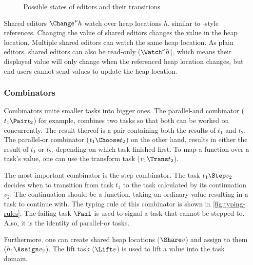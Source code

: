 \begin{figure}
  
  \caption{Possible states of editors and their transitions}
  \label{fig:editor-state}
\end{figure}

Shared editors $\Change^\nu h$ watch over heap locations $h$,
similar to \ML-style references.
Changing the value of shared editors changes the value in the heap location.
Multiple shared editors can watch the same heap location.
As plain editors, shared editors can also be read-only ($\Watch^\nu h$),
which means their displayed value will only change when the referenced heap location changes,
but end-users cannot send values to update the heap location.


\subsubsection{Combinators}

Combinators unite smaller tasks into bigger ones.
The parallel-and combinator ($t_1 \Pair t_2$) for example,
combines two tasks so that both can be worked on concurrently.
The result thereof is a pair containing both the results of $t_1$ and $t_2$.
The parallel-or combinator ($t_1 \Choose t_2$) on the other hand,
results in either the result of $t_1$ or $t_2$,
depending on which task finished first.
To map a function over a task's value,
one can use the transform task ($v_1 \Trans t_2$).

The most important combinator is the step combinator.
The task $t_1 \Step v_2$ decides when to transition from task $t_1$
to the task calculated by its continuation $v_2$.
The continuation should be a function, taking an ordinary value resulting in a task to continue with.
The typing rule of this combinator is shown in \cref{fig:typing-rules}.
The failing task $\Fail$ is used to signal a task that cannot be stepped to.
Also, it is the identity of parallel-or tasks.

Furthermore, one can create shared heap locations ($\Share v$) and assign to them ($h_1 \Assign v_2$).
The lift task ($\Lift v$) is used to lift a value into the task domain.


